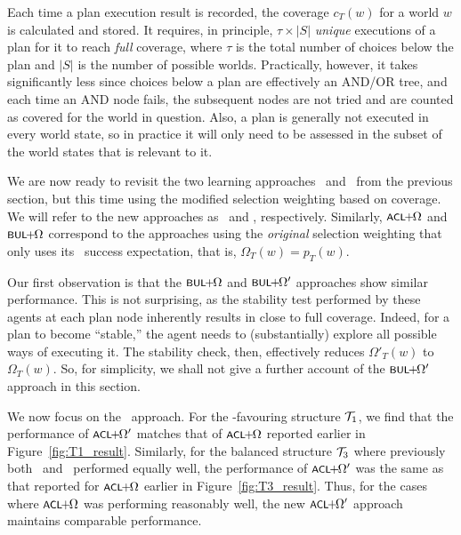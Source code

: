 Each time a plan execution result is recorded, the coverage
$c_T(w)$ for a world $w$ is calculated and stored.
It requires, in principle, $\tau \times |S|$ \emph{unique} executions of
a plan for it to reach \emph{full} coverage, where $\tau$ is the total number of
choices below the plan and $|S|$ is the number of possible worlds. Practically,
however, it takes significantly less since choices below a plan are effectively
an AND/OR tree, and each time an AND node fails, the subsequent
nodes are not tried and are counted as covered for the world in question.
Also, a plan is generally not executed in every world state, so in
practice it will only need to be assessed in the subset of the world
states that is relevant to it.






We are now ready to revisit the two learning approaches \CL\ and \BUL\
from the previous section, but this time using the modified selection weighting
based on coverage.
We will refer to the new approaches as \CLSELB\ and \BULSELB, respectively.
Similarly, $\CLSELA$ and $\BULSELA$ correspond to the approaches using the
\emph{original} selection weighting that only uses its \dt\ success
expectation, that is, $\Omega_T(w) = p_T(w)$.


Our first observation is that the $\BULSELA$ and $\BULSELB$ approaches show
similar performance.
This is not surprising, as the stability test performed by these agents at each
plan node inherently results in close to full coverage. Indeed, for a plan to
become ``stable,'' the agent needs to (substantially) explore all possible  ways
of executing it. The stability check, then, effectively reduces $\Omega'_T(w)$ to
$\Omega_T(w)$.
So, for simplicity, we shall not give a further account of the $\BULSELB$
approach in this section.



We now focus on the \CL\ approach.
For the \CL-favouring structure ${\mathcal{T}}_1$, we find that the performance of $\CLSELB$ matches that
of $\CLSELA$ reported earlier in Figure~\ref{fig:T1_result}.
Similarly, for the balanced structure ${\mathcal{T}}_3$ where previously both \CL\ and
\BUL\ performed equally well, the performance of $\CLSELB$
was the same as that reported for $\CLSELA$ earlier in Figure~\ref{fig:T3_result}.
Thus, for the cases where $\CLSELA$ was performing reasonably well, the new $\CLSELB$ approach maintains comparable performance.

